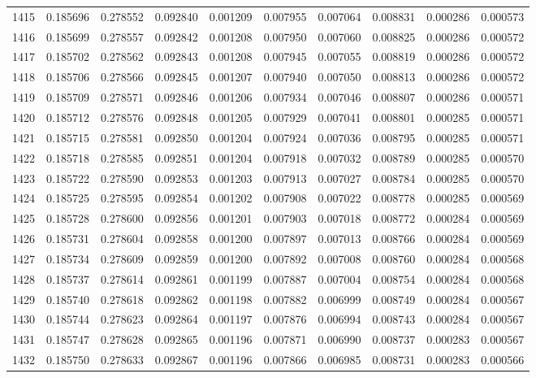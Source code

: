 \begin{tabular}{lrrrrrrrrr}
1415 & 0.185696 & 0.278552 & 0.092840 & 0.001209 & 0.007955 & 0.007064 & 0.008831 & 0.000286 & 0.000573 \\
1416 & 0.185699 & 0.278557 & 0.092842 & 0.001208 & 0.007950 & 0.007060 & 0.008825 & 0.000286 & 0.000572 \\
1417 & 0.185702 & 0.278562 & 0.092843 & 0.001208 & 0.007945 & 0.007055 & 0.008819 & 0.000286 & 0.000572 \\
1418 & 0.185706 & 0.278566 & 0.092845 & 0.001207 & 0.007940 & 0.007050 & 0.008813 & 0.000286 & 0.000572 \\
1419 & 0.185709 & 0.278571 & 0.092846 & 0.001206 & 0.007934 & 0.007046 & 0.008807 & 0.000286 & 0.000571 \\
1420 & 0.185712 & 0.278576 & 0.092848 & 0.001205 & 0.007929 & 0.007041 & 0.008801 & 0.000285 & 0.000571 \\
1421 & 0.185715 & 0.278581 & 0.092850 & 0.001204 & 0.007924 & 0.007036 & 0.008795 & 0.000285 & 0.000571 \\
1422 & 0.185718 & 0.278585 & 0.092851 & 0.001204 & 0.007918 & 0.007032 & 0.008789 & 0.000285 & 0.000570 \\
1423 & 0.185722 & 0.278590 & 0.092853 & 0.001203 & 0.007913 & 0.007027 & 0.008784 & 0.000285 & 0.000570 \\
1424 & 0.185725 & 0.278595 & 0.092854 & 0.001202 & 0.007908 & 0.007022 & 0.008778 & 0.000285 & 0.000569 \\
1425 & 0.185728 & 0.278600 & 0.092856 & 0.001201 & 0.007903 & 0.007018 & 0.008772 & 0.000284 & 0.000569 \\
1426 & 0.185731 & 0.278604 & 0.092858 & 0.001200 & 0.007897 & 0.007013 & 0.008766 & 0.000284 & 0.000569 \\
1427 & 0.185734 & 0.278609 & 0.092859 & 0.001200 & 0.007892 & 0.007008 & 0.008760 & 0.000284 & 0.000568 \\
1428 & 0.185737 & 0.278614 & 0.092861 & 0.001199 & 0.007887 & 0.007004 & 0.008754 & 0.000284 & 0.000568 \\
1429 & 0.185740 & 0.278618 & 0.092862 & 0.001198 & 0.007882 & 0.006999 & 0.008749 & 0.000284 & 0.000567 \\
1430 & 0.185744 & 0.278623 & 0.092864 & 0.001197 & 0.007876 & 0.006994 & 0.008743 & 0.000284 & 0.000567 \\
1431 & 0.185747 & 0.278628 & 0.092865 & 0.001196 & 0.007871 & 0.006990 & 0.008737 & 0.000283 & 0.000567 \\
1432 & 0.185750 & 0.278633 & 0.092867 & 0.001196 & 0.007866 & 0.006985 & 0.008731 & 0.000283 & 0.000566 \\

\end{tabular}
